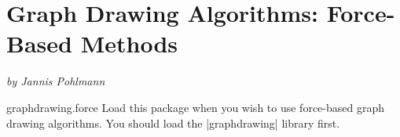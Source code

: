 %
%
%

\section{Graph Drawing Algorithms: Force-Based Methods}
\label{section-library-graphdrawing-force-based}

{\emph{by Jannis Pohlmann}}


\begin{tikzlibrary}{graphdrawing.force}
  Load this package when you wish to use force-based graph drawing
  algorithms. You should load the |graphdrawing| library first.
\end{tikzlibrary}

\ifluatex\relax{}\expandafter\endinput\fi


\subsection{Overview}


http://www.tcs.uni-luebeck.de/downloads/papers/2011/2011-configurable-graph-drawing-algorithms-jannis-pohlmann.pdf






